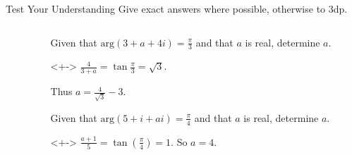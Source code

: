 \documentclass[8pt]{beamer}
\begin{document}
\begin{frame}{Test Your Understanding}
	Give exact answers where possible, otherwise to 3dp.

	\begin{columns}
	\begin{column}{.5\linewidth}
		\centering
	\end{column}
	\begin{column}{.5\linewidth}
	\begin{problem}
		Given that $\text{arg}(3+a+4i)=\frac{\pi}{3}$ and that $a$ is real, determine $a$.
	\end{problem}
	\begin{solution}<+->
		$\frac{4}{3+a}=\tan{\frac{\pi}{3}}=\sqrt{3} .$

		Thus $a=\frac{4}{\sqrt{3} }-3$.
	\end{solution}
	\begin{problem}
		Given that $ \text{arg}(5+i+ai)=\frac{\pi}{4}$ and that $a$ is real, determine  $a$.
	\end{problem}
	\begin{solution}<+->
		$\frac{a+1}{5}=\tan(\frac{\pi}{4})=1$. So $a=4$.
	\end{solution}
	\end{column}
	\end{columns}

\end{frame}
\end{document}
